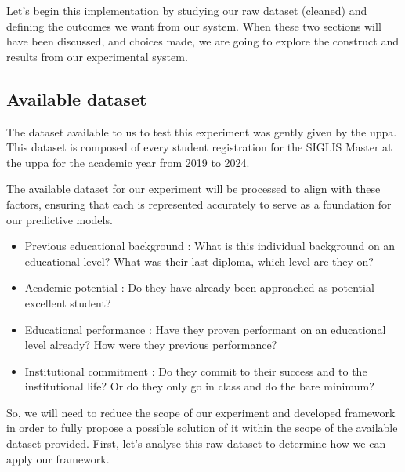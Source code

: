\documentclass[../main.tex]{subfiles}
\begin{document}
Let's begin this implementation by studying our raw dataset (cleaned) and defining the outcomes we want from our system. When these two sections will have been discussed, and choices made, we are going to explore the construct and results from our experimental system.

\subsection{Available dataset}
\label{subsec:available_ds}
The dataset available to us to test this experiment was gently given by the \acrfull{uppa}.
This dataset is composed of every student registration for the SIGLIS Master at the \acrshort{uppa} for the academic year from 2019 to 2024.

The available dataset for our experiment will be processed to align with these factors, ensuring that each is represented accurately to serve as a foundation for our predictive models.
\begin{itemize}
    \item Previous educational background : What is this individual background on an educational level? What was their last diploma, which level are they on? 
    \item Academic potential : Do they have already been approached as potential excellent student?
    \item Educational performance : Have they proven performant on an educational level already? How were they previous performance?
    \item Institutional commitment : Do they commit to their success and to the institutional life? Or do they only go in class and do the bare minimum?
\end{itemize}

So, we will need to reduce the scope of our experiment and developed framework in order to fully propose a possible solution of it within the scope of the available dataset provided. 
First, let's analyse this raw dataset to determine how we can apply our framework.
\end{document}
